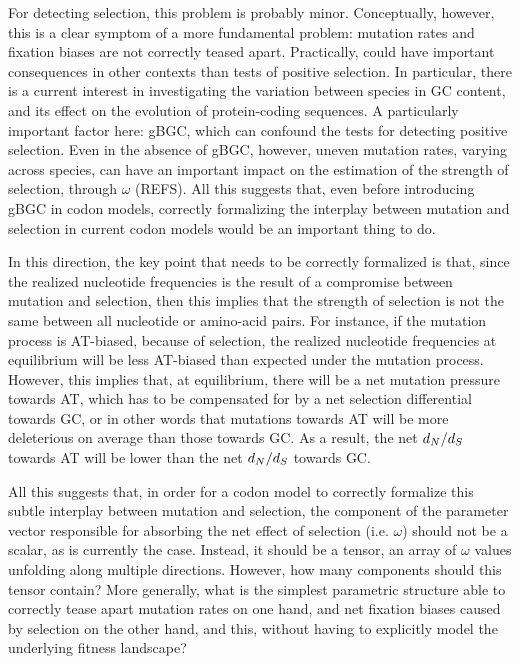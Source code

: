 For detecting selection, this problem is probably minor.
Conceptually, however, this is a clear symptom of a more fundamental problem: mutation rates and fixation biases are not correctly teased apart.
Practically, could have important consequences in other contexts than tests of positive selection.
In particular, there is a current interest in investigating the variation between species in GC content, and its effect on the evolution of protein-coding sequences.
A particularly important factor here: gBGC, which can confound the tests for detecting positive selection.
Even in the absence of gBGC, however, uneven mutation rates, varying across species, can have an important impact on the estimation of the strength of selection, through $\omega$ (REFS).
All this suggests that, even before introducing gBGC in codon models, correctly formalizing the interplay between mutation and selection in current codon models would be an important thing to do.

In this direction, the key point that needs to be correctly formalized is that, since the realized nucleotide frequencies is the result of a compromise between mutation and selection, then this implies that the strength of selection is not the same between all nucleotide or amino-acid pairs.
For instance, if the mutation process is AT-biased, because of selection, the realized nucleotide frequencies at equilibrium will be less AT-biased than expected under the mutation process.
However, this implies that, at equilibrium, there will be a net mutation pressure towards AT, which has to be compensated for by a net selection differential towards GC, or in other words that mutations towards AT will be more deleterious on average than those towards GC.
As a result, the net $d_N / d_S$ towards AT will be lower than the net $d_N / d_S$ towards GC.

All this suggests that, in order for a codon model to correctly formalize this subtle interplay between mutation and selection, the component of the parameter vector responsible for absorbing the net effect of selection (i.e. $\omega$) should not be a scalar, as is currently the case.
Instead, it should be a tensor, an array of $\omega$ values unfolding along multiple directions.
However, how many components should this tensor contain?
More generally, what is the simplest parametric structure able to correctly tease apart mutation rates on one hand, and net fixation biases caused by selection on the other hand, and this, without having to explicitly model the underlying fitness landscape?

